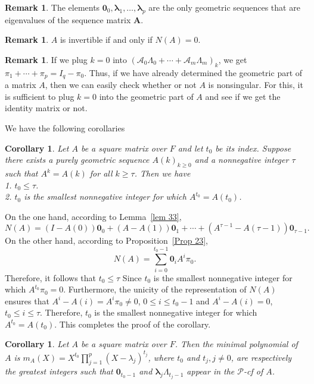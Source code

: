 \documentclass[12pt]{amsart}
\newtheorem{cor}[thrm]{Corollary}
\theoremstyle{definition}
\newtheorem{remark}[thrm]{Remark}
\numberwithin{equation}{section}
\numberwithin{equation}{section}
\begin{document}
\begin{remark}
The elements $\pmb{0}_{0},\pmb{\lambda}_{1},\ldots,\pmb{\lambda}_{p}$ are the only geometric sequences that are eigenvalues of the sequence matrix $\pmb{A}$.
\end{remark}
\begin{remark}
$A$ is invertible if and only if $N(A)=0$.
\end{remark}
\begin{remark}
If we plug $k=0$ into $(\mathcal{A}_{0}\Lambda_{0} + \cdots + \mathcal{A}_{m}\Lambda_{m})_{k}$, we get $\pi_{1}+\cdots+\pi_{p}=I_{q}-\pi_{0}$. Thus, if we have already determined the geometric part of a matrix $A$, then we can easily check whether or not $A$ is nonsingular. For this, it is sufficient to plug $k=0$ into the geometric part of $A$ and see if we get the identity matrix or not.
\end{remark}
We have the following corollaries
\begin{cor}\label{Cor 21} Let $A$ be a square matrix over $F$ and let $t_{0}$ be its index. Suppose there exists a purely geometric sequence $A(k)_{k\geq 0}$ and a nonnegative integer $\tau$ such that $A^{k}=A(k)$ for all $k\geq \tau$. Then we have
\\1. $t_{0}\leq \tau$.
\\2. $t_{0}$ is the smallest nonnegative integer for which $A^{t_{0}}=A(t_{0})$.
\end{cor}
\proof
On the one hand, according to Lemma~\ref{lem 33}, $$N(A)=(I-A(0))\pmb{0}_{0}+(A-A(1))\pmb{0}_{1}+\cdots+(A^{\tau-1}-A(\tau-1))\pmb{0}_{\tau-1}.$$
On the other hand, according to Proposition~\ref{Prop 23},
$$N(A)=\displaystyle\sum_{i=0}^{t_{0}-1}\pmb{0}_{i}A^{i}\pi_{0}.$$
Therefore, it follows that $t_{0}\leq \tau$ Since $t_{0}$ is the smallest nonnegative integer for which $A^{t_{0}}\pi_{0}=0$. Furthermore, the unicity of the representation of $N(A)$ ensures that $A^{i}-A(i)=A^{i}\pi_{0}\neq 0$, $0\leq i\leq t_{0}-1$ and $A^{i}-A(i)=0$, $t_{0}\leq i\leq \tau$. Therefore,  $t_{0}$ is the smallest nonnegative integer for which $A^{t_{0}}=A(t_{0})$. This completes the proof of the corollary.
\endproof
\begin{cor}\label{Cor 22} Let $A$ be a square matrix over $F$. Then the minimal polynomial of $A$ is $m_{A}(X)=X^{t_{0}}\prod_{j=1}^{p}(X-\lambda_{j})^{t_{j}}$, where $t_{0}$ and $t_{j}, j\neq 0$, are respectively the greatest integers such that $\pmb{0}_{t_{0}-1}$ and $\pmb{\lambda}_{j}\Lambda_{t_{j}-1}$ appear in the $\mathcal{P}$-cf of $A$.
\end{cor}
\end{document}
